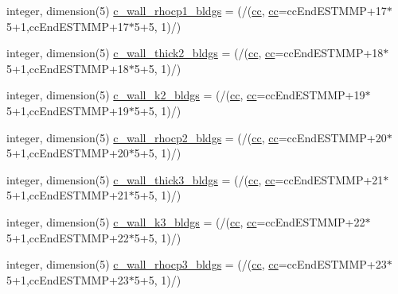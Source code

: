 \begin{DoxyCompactItemize}
\item 
integer, dimension(5) \hyperlink{namespaceallocatearray_a5824f50ff58d28c3b0b4326a2ccfe541}{c\+\_\+wall\+\_\+rhocp1\+\_\+bldgs} = (/(\hyperlink{namespaceallocatearray_ac863c81704eb507dee10f5e10741e10c}{cc}, \hyperlink{namespaceallocatearray_ac863c81704eb507dee10f5e10741e10c}{cc}=cc\+End\+E\+S\+T\+M\+MP+17$\ast$5+1,cc\+End\+E\+S\+T\+M\+MP+17$\ast$5+5, 1)/)
\item 
integer, dimension(5) \hyperlink{namespaceallocatearray_afa52a2b3030dd70bca77ed4c1a0d4717}{c\+\_\+wall\+\_\+thick2\+\_\+bldgs} = (/(\hyperlink{namespaceallocatearray_ac863c81704eb507dee10f5e10741e10c}{cc}, \hyperlink{namespaceallocatearray_ac863c81704eb507dee10f5e10741e10c}{cc}=cc\+End\+E\+S\+T\+M\+MP+18$\ast$5+1,cc\+End\+E\+S\+T\+M\+MP+18$\ast$5+5, 1)/)
\item 
integer, dimension(5) \hyperlink{namespaceallocatearray_aa1c4bb9d1b4557d6980c73a3c27feba8}{c\+\_\+wall\+\_\+k2\+\_\+bldgs} = (/(\hyperlink{namespaceallocatearray_ac863c81704eb507dee10f5e10741e10c}{cc}, \hyperlink{namespaceallocatearray_ac863c81704eb507dee10f5e10741e10c}{cc}=cc\+End\+E\+S\+T\+M\+MP+19$\ast$5+1,cc\+End\+E\+S\+T\+M\+MP+19$\ast$5+5, 1)/)
\item 
integer, dimension(5) \hyperlink{namespaceallocatearray_af8543b34d920034e2761a01b4e6f1db5}{c\+\_\+wall\+\_\+rhocp2\+\_\+bldgs} = (/(\hyperlink{namespaceallocatearray_ac863c81704eb507dee10f5e10741e10c}{cc}, \hyperlink{namespaceallocatearray_ac863c81704eb507dee10f5e10741e10c}{cc}=cc\+End\+E\+S\+T\+M\+MP+20$\ast$5+1,cc\+End\+E\+S\+T\+M\+MP+20$\ast$5+5, 1)/)
\item 
integer, dimension(5) \hyperlink{namespaceallocatearray_afeb16544bc15664add2e4c9c69fff38a}{c\+\_\+wall\+\_\+thick3\+\_\+bldgs} = (/(\hyperlink{namespaceallocatearray_ac863c81704eb507dee10f5e10741e10c}{cc}, \hyperlink{namespaceallocatearray_ac863c81704eb507dee10f5e10741e10c}{cc}=cc\+End\+E\+S\+T\+M\+MP+21$\ast$5+1,cc\+End\+E\+S\+T\+M\+MP+21$\ast$5+5, 1)/)
\item 
integer, dimension(5) \hyperlink{namespaceallocatearray_a50381945e556319590186a7bd7c04cd6}{c\+\_\+wall\+\_\+k3\+\_\+bldgs} = (/(\hyperlink{namespaceallocatearray_ac863c81704eb507dee10f5e10741e10c}{cc}, \hyperlink{namespaceallocatearray_ac863c81704eb507dee10f5e10741e10c}{cc}=cc\+End\+E\+S\+T\+M\+MP+22$\ast$5+1,cc\+End\+E\+S\+T\+M\+MP+22$\ast$5+5, 1)/)
\item 
integer, dimension(5) \hyperlink{namespaceallocatearray_a60eaef231cee8d3b58a1c5284dd51d4c}{c\+\_\+wall\+\_\+rhocp3\+\_\+bldgs} = (/(\hyperlink{namespaceallocatearray_ac863c81704eb507dee10f5e10741e10c}{cc}, \hyperlink{namespaceallocatearray_ac863c81704eb507dee10f5e10741e10c}{cc}=cc\+End\+E\+S\+T\+M\+MP+23$\ast$5+1,cc\+End\+E\+S\+T\+M\+MP+23$\ast$5+5, 1)/)

\end{DoxyCompactItemize}
